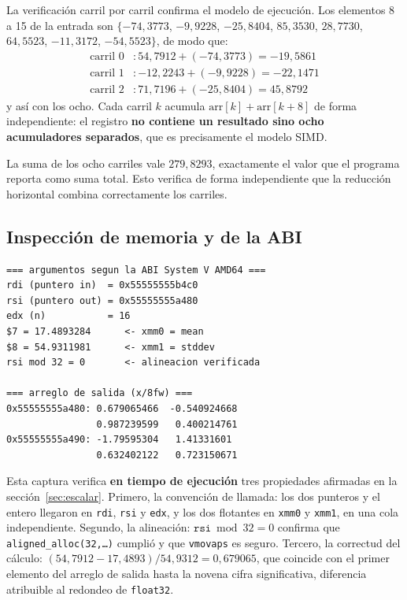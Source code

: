 \documentclass[journal]{IEEEtran}
\begin{document}
La verificación carril por carril confirma el modelo de ejecución. Los
elementos 8 a 15 de la entrada son $\{-74,3773$, $-9,9228$,
$-25,8404$, $85,3530$, $28,7730$, $64,5523$, $-11,3172$,
$-54,5523\}$, de modo que:
\begin{align*}
  \text{carril } 0 &: 54,7912 + (-74,3773) = -19,5861 \\
  \text{carril } 1 &: -12,2243 + (-9,9228) = -22,1471 \\
  \text{carril } 2 &: 71,7196 + (-25,8404) = 45,8792
\end{align*}
y así con los ocho. Cada carril $k$ acumula $\mathrm{arr}[k] +
\mathrm{arr}[k+8]$ de forma independiente: el registro \textbf{no contiene
un resultado sino ocho acumuladores separados}, que es precisamente el
modelo SIMD.

La suma de los ocho carriles vale $279,8293$, exactamente el valor que el
programa reporta como suma total. Esto verifica de forma independiente que
la reducción horizontal combina correctamente los carriles.

\subsection{Inspección de memoria y de la ABI}

\begin{lstlisting}[style=shell,caption={Argumentos recibidos y arreglo de
  salida tras el bucle de normalización.}, label={lst:gdb-mem}]
=== argumentos segun la ABI System V AMD64 ===
rdi (puntero in)  = 0x55555555b4c0
rsi (puntero out) = 0x55555555a480
edx (n)           = 16
$7 = 17.4893284      <- xmm0 = mean
$8 = 54.9311981      <- xmm1 = stddev
rsi mod 32 = 0       <- alineacion verificada

=== arreglo de salida (x/8fw) ===
0x55555555a480: 0.679065466  -0.540924668
                0.987239599   0.400214761
0x55555555a490: -1.79595304   1.41331601
                0.632402122   0.723150671
\end{lstlisting}

Esta captura verifica \textbf{en tiempo de ejecución} tres propiedades
afirmadas en la sección~\ref{sec:escalar}. Primero, la convención de
llamada: los dos punteros y el entero llegaron en \texttt{rdi},
\texttt{rsi} y \texttt{edx}, y los dos flotantes en \texttt{xmm0} y
\texttt{xmm1}, en una cola independiente. Segundo, la alineación:
$\texttt{rsi} \bmod 32 = 0$ confirma que \texttt{aligned\_alloc(32,\dots)}
cumplió y que \texttt{vmovaps} es seguro. Tercero, la correctud del
cálculo: $(54,7912 - 17,4893)/54,9312 = 0,679065$, que coincide
con el primer elemento del arreglo de salida hasta la novena cifra
significativa, diferencia atribuible al redondeo de \texttt{float32}.
\end{document}

